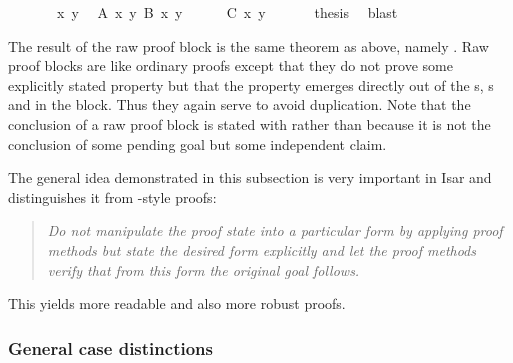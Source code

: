 \begin{isabellebody}
\ {}\isanewline
\ \ \isamarkupfalse%
\ \isamarkupfalse%
\ x\ y\ \isamarkupfalse%
\ {}A\ x\ y{}\ {}B\ x\ y{}\isanewline
\ \ \ \ \isamarkupfalse%
\ {}C\ x\ y{}\ \isamarkupfalse%
\ \isamarkupfalse%
\isanewline
\ \ \isamarkupfalse%
\ {}thesis\ \isamarkupfalse%
\ blast\isanewline
{}\isamarkupfalse%
%
\endisatagproof
{\isafoldproof}%
%
\isadelimproof
%
\endisadelimproof
%
\begin{isamarkuptext}%
\noindent The result of the raw proof block is the same theorem
as above, namely .  Raw
proof blocks are like ordinary proofs except that they do not prove
some explicitly stated property but that the property emerges directly
out of the s, s and
 in the block. Thus they again serve to avoid
duplication. Note that the conclusion of a raw proof block is stated with
 rather than  because it is not the
conclusion of some pending goal but some independent claim.

The general idea demonstrated in this subsection is very
important in Isar and distinguishes it from -style proofs:
\begin{quote}\em
Do not manipulate the proof state into a particular form by applying
proof methods but state the desired form explicitly and let the proof
methods verify that from this form the original goal follows.
\end{quote}
This yields more readable and also more robust proofs.

\subsubsection{General case distinctions}


\end{isamarkuptext}
\end{isabellebody}

